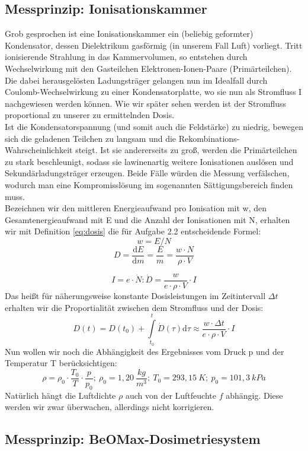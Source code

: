 \subsection{Messprinzip: Ionisationskammer}
Grob gesprochen ist eine Ionisationskammer ein (beliebig geformter) Kondensator, dessen Dielektrikum gasförmig (in unserem Fall Luft) vorliegt. Tritt ionisierende Strahlung in das Kammervolumen, so entstehen durch Wechselwirkung mit den Gasteilchen Elektronen-Ionen-Paare (Primärteilchen). Die dabei herausgelösten Ladungsträger gelangen nun im Idealfall durch Coulomb-Wechselwirkung zu einer Kondensatorplatte, wo sie nun als Stromfluss I nachgewiesen werden können. Wie wir später sehen werden ist der Stromfluss proportional zu unserer zu ermittelnden Dosis.\\ 
Ist die Kondensatorspannung (und somit auch die Feldstärke) zu niedrig, bewegen sich die geladenen Teilchen zu langsam und die Rekombinations-Wahrscheinlichkeit steigt. Ist sie andererseits zu groß, werden die Primärteilchen zu stark beschleunigt, sodass sie lawinenartig weitere Ionisationen auslösen und Sekundärladungsträger erzeugen. Beide Fälle würden die Messung verfälschen, wodurch man eine Kompromisslösung im sogenannten Sättigungsbereich finden muss.\\
Bezeichnen wir den mittleren Energieaufwand pro Ionisation mit w, den Gesamtenergieaufwand mit E und die Anzahl der Ionisationen mit N, erhalten wir mit Definition \eqref{eq:dosis} die für Aufgabe 2.2 entscheidende Formel:
\begin{equation}
	w = E / N
\end{equation}
\begin{equation}
	D = \frac{\textrm{d}E}{\textrm{d}m}=\frac{E}{m}=\frac{w \cdot N}{\rho \cdot V}
\end{equation}

\begin{equation}
	I = e \cdot \dot{N}: \dot{D} = \frac{w}{e \cdot \rho \cdot V} \cdot I
\end{equation}
Das heißt für näherungsweise konstante Dosisleistungen im Zeitintervall $\Delta t$ erhalten wir die Proportialität zwischen dem Stromfluss und der Dosis:
\begin{equation}
	D(t) = D(t_0) + \int \limits_{t_0}^{t} \dot{D}(\tau) \mathrm{d}\tau \approx \frac{w \cdot \Delta t}{e \cdot \rho \cdot V} \cdot I
\end{equation}
Nun wollen wir noch die Abhängigkeit des Ergebnisses vom Druck p und der Temperatur T berücksichtigen:
\begin{equation}
	\rho = \rho_0 \cdot \frac{T_0}{T} \cdot \frac{p}{p_0};
	\ \rho_0 = 1,20\ \frac{kg}{m^3};\ T_0 = 293,15\ K;\ p_0 = 101,3\ kPa
\end{equation}
Natürlich hängt die Luftdichte $\rho$ auch von der Luftfeuchte $f$ abhängig. Diese werden wir zwar überwachen, allerdings nicht korrigieren.

\subsection{Messprinzip: BeOMax-Dosimetriesystem}